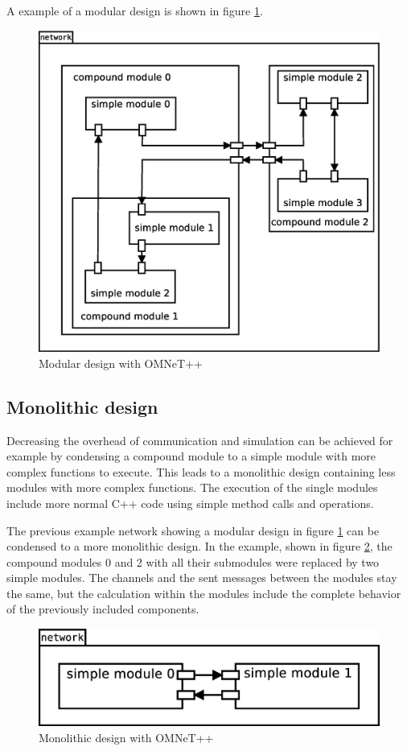 \documentclass[journal]{IEEEtran}
\begin{document}
A example of a modular design is shown in figure \ref{fig:OMNeTModularDesign}.

\begin{figure}
    \centering
    \includegraphics[width=0.9\columnwidth]{OMNeTModularDesign.eps}
    \caption{Modular design with OMNeT++}
    \label{fig:OMNeTModularDesign}
\end{figure}

\subsection{Monolithic design}
Decreasing the overhead of communication and simulation can be achieved for example by condensing a compound module to a simple module with more complex functions to execute.
This leads to a monolithic design containing less modules with more complex functions.
The execution of the single modules include more normal C++ code using simple method calls and operations.

The previous example network showing a modular design in figure \ref{fig:OMNeTModularDesign} can be condensed to a more monolithic design.
In the example, shown in figure \ref{fig:OMNeTMonolithicDesign}, the compound modules 0 and 2 with all their submodules were replaced by two simple modules.
The channels and the sent messages between the modules stay the same, but the calculation within the modules include the complete behavior of the previously included components.

\begin{figure}
    \centering
    \includegraphics[width=0.9\columnwidth]{OMNeTMonolithicDesign.eps}
    \caption{Monolithic design with OMNeT++}
    \label{fig:OMNeTMonolithicDesign}
\end{figure}
\end{document}
